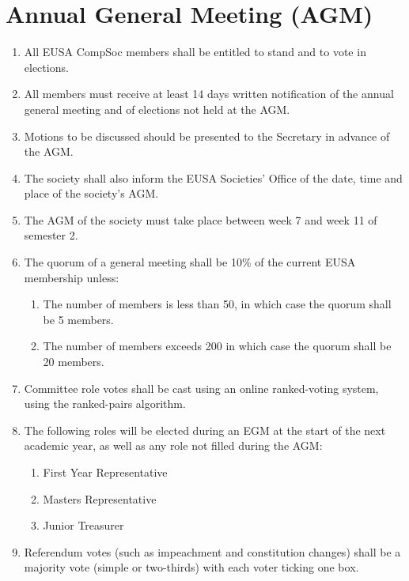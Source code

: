 \section{Annual General Meeting (AGM)}

\begin{enumerate}

\item All EUSA CompSoc members shall be entitled to stand and to vote in elections.

\item All members must receive at least 14 days written notification of the annual general meeting and of elections not held at the AGM\@.

\item Motions to be discussed should be presented to the Secretary in advance of the AGM\@.

\item The society shall also inform the EUSA Societies' Office of the date, time and place of the society's AGM\@.

\item The AGM of the society must take place between week 7 and week 11 of semester 2.

\item The quorum of a general meeting shall be 10\% of the current EUSA membership unless:
  \begin{enumerate}
  \item The number of members is less than 50, in which case the quorum shall be 5 members.
  \item The number of members exceeds 200 in which case the quorum shall be 20 members.
  \end{enumerate}

\item Committee role votes shall be cast using an online ranked-voting system, using the ranked-pairs algorithm.
\item The following roles will be elected during an EGM at the start of the next academic year, as well as any role not filled during the AGM:
\begin{enumerate}
  \item First Year Representative
  \item Masters Representative
  \item Junior Treasurer
\end{enumerate}

\item Referendum votes (such as impeachment and constitution changes) shall be a majority vote (simple or two-thirds) with each voter ticking one box.


\end{enumerate}

